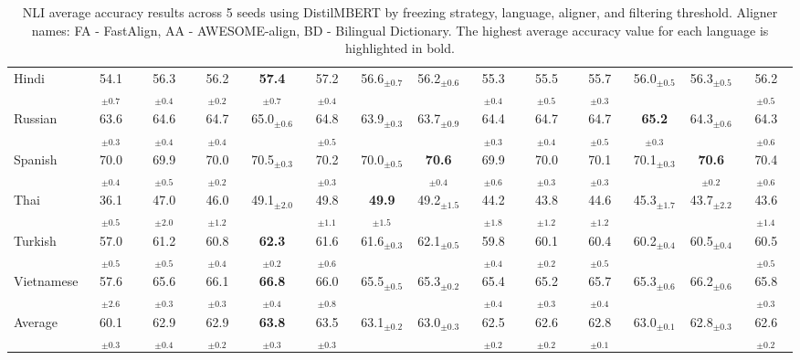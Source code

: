 \begin{table*}[ht]
{\begin{tabular}{lccccccccccccc}
Hindi & 54.1$_{\pm 0.7}$ & 56.3$_{\pm 0.4}$ & 56.2$_{\pm 0.2}$ & \textbf{57.4}$_{\pm 0.7}$ & 57.2$_{\pm 0.4}$ & 56.6$_{\pm 0.7}$ & 56.2$_{\pm 0.6}$ & 55.3$_{\pm 0.4}$ & 55.5$_{\pm 0.5}$ & 55.7$_{\pm 0.3}$ & 56.0$_{\pm 0.5}$ & 56.3$_{\pm 0.5}$ & 56.2$_{\pm 0.5}$ \\
Russian & 63.6$_{\pm 0.3}$ & 64.6$_{\pm 0.4}$ & 64.7$_{\pm 0.4}$ & 65.0$_{\pm 0.6}$ & 64.8$_{\pm 0.5}$ & 63.9$_{\pm 0.3}$ & 63.7$_{\pm 0.9}$ & 64.4$_{\pm 0.3}$ & 64.7$_{\pm 0.4}$ & 64.7$_{\pm 0.5}$ & \textbf{65.2}$_{\pm 0.3}$ & 64.3$_{\pm 0.6}$ & 64.3$_{\pm 0.6}$ \\
Spanish & 70.0$_{\pm 0.4}$ & 69.9$_{\pm 0.5}$ & 70.0$_{\pm 0.2}$ & 70.5$_{\pm 0.3}$ & 70.2$_{\pm 0.3}$ & 70.0$_{\pm 0.5}$ & \textbf{70.6}$_{\pm 0.4}$ & 69.9$_{\pm 0.6}$ & 70.0$_{\pm 0.3}$ & 70.1$_{\pm 0.3}$ & 70.1$_{\pm 0.3}$ & \textbf{70.6}$_{\pm 0.2}$ & 70.4$_{\pm 0.6}$ \\
Thai & 36.1$_{\pm 0.5}$ & 47.0$_{\pm 2.0}$ & 46.0$_{\pm 1.2}$ & 49.1$_{\pm 2.0}$ & 49.8$_{\pm 1.1}$ & \textbf{49.9}$_{\pm 1.5}$ & 49.2$_{\pm 1.5}$ & 44.2$_{\pm 1.8}$ & 43.8$_{\pm 1.2}$ & 44.6$_{\pm 1.2}$ & 45.3$_{\pm 1.7}$ & 43.7$_{\pm 2.2}$ & 43.6$_{\pm 1.4}$ \\
Turkish & 57.0$_{\pm 0.5}$ & 61.2$_{\pm 0.5}$ & 60.8$_{\pm 0.4}$ & \textbf{62.3}$_{\pm 0.2}$ & 61.6$_{\pm 0.6}$ & 61.6$_{\pm 0.3}$ & 62.1$_{\pm 0.5}$ & 59.8$_{\pm 0.4}$ & 60.1$_{\pm 0.2}$ & 60.4$_{\pm 0.5}$ & 60.2$_{\pm 0.4}$ & 60.5$_{\pm 0.4}$ & 60.5$_{\pm 0.5}$ \\
Vietnamese & 57.6$_{\pm 2.6}$ & 65.6$_{\pm 0.3}$ & 66.1$_{\pm 0.3}$ & \textbf{66.8}$_{\pm 0.4}$ & 66.0$_{\pm 0.8}$ & 65.5$_{\pm 0.5}$ & 65.3$_{\pm 0.2}$ & 65.4$_{\pm 0.4}$ & 65.2$_{\pm 0.3}$ & 65.7$_{\pm 0.4}$ & 65.3$_{\pm 0.6}$ & 66.2$_{\pm 0.6}$ & 65.8$_{\pm 0.3}$ \\
\hline
Average & 60.1$_{\pm 0.3}$ & 62.9$_{\pm 0.4}$ & 62.9$_{\pm 0.2}$ & \textbf{63.8}$_{\pm 0.3}$ & 63.5$_{\pm 0.3}$ & 63.1$_{\pm 0.2}$ & 63.0$_{\pm 0.3}$ & 62.5$_{\pm 0.2}$ & 62.6$_{\pm 0.2}$ & 62.8$_{\pm 0.1}$ & 63.0$_{\pm 0.1}$ & 62.8$_{\pm 0.3}$ & 62.6$_{\pm 0.2}$ \\

    \bottomrule
    \end{tabular}
    }
    \caption{NLI average accuracy results across 5 seeds using DistilMBERT by freezing strategy, language, aligner, and filtering threshold. Aligner names: FA - FastAlign, AA - AWESOME-align, BD - Bilingual Dictionary. The highest average accuracy value for each language is highlighted in bold.}
    \label{table:results_distilMBERT_NLI_filtering}
    \end{table*}
    